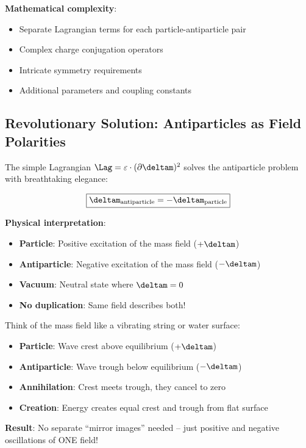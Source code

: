 	\textbf{Mathematical complexity}:
	\begin{itemize}
		\item Separate Lagrangian terms for each particle-antiparticle pair
		\item Complex charge conjugation operators
		\item Intricate symmetry requirements
		\item Additional parameters and coupling constants
	\end{itemize}
	
	\subsection{Revolutionary Solution: Antiparticles as Field Polarities}
	
	The simple Lagrangian $\Lag = \varepsilon \cdot (\partial \deltam)^2$ solves the antiparticle problem with breathtaking elegance:
	
	\begin{equation}
		\boxed{\deltam_{\text{antiparticle}} = -\deltam_{\text{particle}}}
		\label{eq:antiparticle_solution}
	\end{equation}
	
	\textbf{Physical interpretation}:
	\begin{itemize}
		\item \textbf{Particle}: Positive excitation of the mass field ($+\deltam$)
		\item \textbf{Antiparticle}: Negative excitation of the mass field ($-\deltam$)  
		\item \textbf{Vacuum}: Neutral state where $\deltam = 0$
		\item \textbf{No duplication}: Same field describes both!
	\end{itemize}
	
	\begin{tcolorbox}[colback=green!5!white,colframe=green!75!black,title=Elegant Antiparticle Picture]
		Think of the mass field like a vibrating string or water surface:
		\begin{itemize}
			\item \textbf{Particle}: Wave crest above equilibrium ($+\deltam$)
			\item \textbf{Antiparticle}: Wave trough below equilibrium ($-\deltam$)
			\item \textbf{Annihilation}: Crest meets trough, they cancel to zero
			\item \textbf{Creation}: Energy creates equal crest and trough from flat surface
		\end{itemize}
		
		\textbf{Result}: No separate ``mirror images'' needed -- just positive and negative oscillations of ONE field!
	\end{tcolorbox}
	
